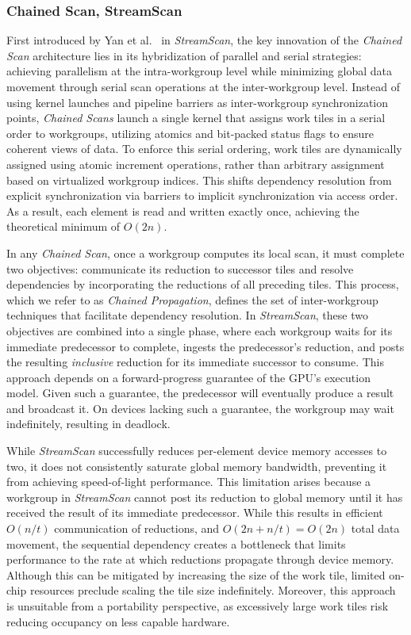 \documentclass[acmsmall, manuscript, screen, review, anonymous]{acmart}
\begin{document}
\subsubsection{Chained Scan, StreamScan}
First introduced by Yan et al.~\cite{10.1145/2442516.2442539} in \emph{StreamScan}, the key innovation of the \emph{Chained Scan} architecture lies in its hybridization of parallel and serial strategies: achieving parallelism at the intra-workgroup level while minimizing global data movement through serial scan operations at the inter-workgroup level. Instead of using kernel launches and pipeline barriers as inter-workgroup synchronization points, \emph{Chained Scans} launch a single kernel that assigns work tiles in a serial order to workgroups, utilizing atomics and bit-packed status flags to ensure coherent views of data. To enforce this serial ordering, work tiles are dynamically assigned using atomic increment operations, rather than arbitrary assignment based on virtualized workgroup indices. This shifts dependency resolution from explicit synchronization via barriers to implicit synchronization via access order. As a result, each element is read and written exactly once, achieving the theoretical minimum of $O(2n)$.

In any \emph{Chained Scan}, once a workgroup computes its local scan, it must complete two objectives: communicate its reduction to successor tiles and resolve dependencies by incorporating the reductions of all preceding tiles. This process, which we refer to as \emph{Chained Propagation}, defines the set of inter-workgroup techniques that facilitate dependency resolution. In \emph{StreamScan}, these two objectives are combined into a single phase, where each workgroup waits for its immediate predecessor to complete, ingests the predecessor's reduction, and posts the resulting \emph{inclusive} reduction for its immediate successor to consume. This approach depends on a forward-progress guarantee of the GPU's execution model. Given such a guarantee, the predecessor will eventually produce a result and broadcast it. On devices lacking such a guarantee, the workgroup may wait indefinitely, resulting in deadlock.

While \emph{StreamScan} successfully reduces per-element device memory accesses to two, it does not consistently saturate global memory bandwidth, preventing it from achieving speed-of-light performance. This limitation arises because a workgroup in \emph{StreamScan} cannot post its reduction to global memory until it has received the result of its immediate predecessor. While this results in efficient $O(n/t)$ communication of reductions, and $O(2n+ n/t)= O(2n)$ total data movement, the sequential dependency creates a bottleneck that limits performance to the rate at which reductions propagate through device memory. Although this can be mitigated by increasing the size of the work tile, limited on-chip resources preclude scaling the tile size indefinitely. Moreover, this approach is unsuitable from a portability perspective, as excessively large work tiles risk reducing occupancy on less capable hardware.
\end{document}

